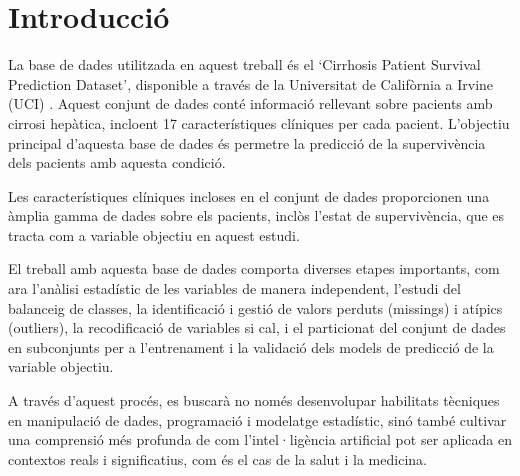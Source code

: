 \section{Introducció}
La base de dades utilitzada en aquest treball és el `Cirrhosis Patient Survival Prediction Dataset', disponible a través de la Universitat de Califòrnia a Irvine (UCI) \cite{misc_cirrhosis_patient_survival_prediction_878}. Aquest conjunt de dades conté informació rellevant sobre pacients amb cirrosi hepàtica, incloent 17 característiques clíniques per cada pacient. L'objectiu principal d'aquesta base de dades és permetre la predicció de la supervivència dels pacients amb aquesta condició.

Les característiques clíniques incloses en el conjunt de dades proporcionen una àmplia gamma de dades sobre els pacients, inclòs l'estat de supervivència, que es tracta com a variable objectiu en aquest estudi.

El treball amb aquesta base de dades comporta diverses etapes importants, com ara l'anàlisi estadístic de les variables de manera independent, l'estudi del balanceig de classes, la identificació i gestió de valors perduts (missings) i atípics (outliers), la recodificació de variables si cal, i el particionat del conjunt de dades en subconjunts per a l'entrenament i la validació dels models de predicció de la variable objectiu.

A través d'aquest procés, es buscarà no només desenvolupar habilitats tècniques en manipulació de dades, programació i modelatge estadístic, sinó també cultivar una comprensió més profunda de com l'intel·ligència artificial pot ser aplicada en contextos reals i significatius, com és el cas de la salut i la medicina.

